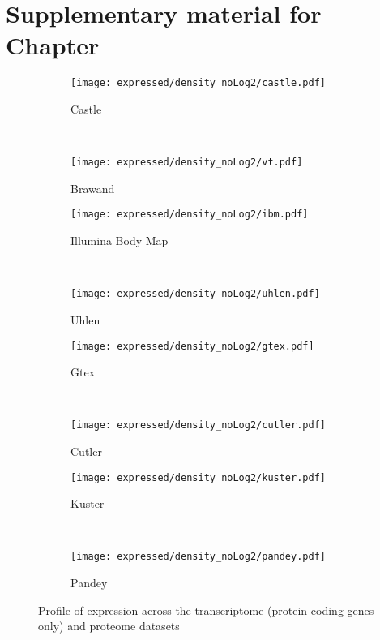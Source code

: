 \chapter{Supplementary material for Chapter }
\label{ch:SupplExpress}

\begin{figure}
    \centering
    \begin{subfigure}[b]{0.35\textwidth}
        \centering \texttt{[image: expressed/density\_noLog2/castle.pdf]}
        \caption{Castle}\label{fig:densityCastle_nolog2}
    \end{subfigure}%
~%
    \begin{subfigure}[b]{0.35\textwidth}
        \centering \texttt{[image: expressed/density\_noLog2/vt.pdf]}
        \caption{Brawand}\label{fig:densityBrawand_nolog2}
    \end{subfigure}

    \begin{subfigure}[b]{0.35\textwidth}
        \centering \texttt{[image: expressed/density\_noLog2/ibm.pdf]}
        \caption{Illumina Body Map}\label{fig:densityIBM_nolog2}
    \end{subfigure}%
~%
    \begin{subfigure}[b]{0.35\textwidth}
        \centering \texttt{[image: expressed/density\_noLog2/uhlen.pdf]}
        \caption{Uhlen}\label{fig:densityUhlen_nolog2}
    \end{subfigure}

    \begin{subfigure}[b]{0.35\textwidth}
        \centering \texttt{[image: expressed/density\_noLog2/gtex.pdf]}
        \caption{Gtex}\label{fig:densityGtex_nolog2}
    \end{subfigure}%
~%
    \begin{subfigure}[b]{0.35\textwidth}
        \centering \texttt{[image: expressed/density\_noLog2/cutler.pdf]}
        \caption{Cutler}\label{fig:densityCutler_nolog2}
    \end{subfigure}

    \begin{subfigure}[b]{0.35\textwidth}
        \centering \texttt{[image: expressed/density\_noLog2/kuster.pdf]}
        \caption{Kuster}\label{fig:densityKuster_nolog2}
    \end{subfigure}%
~%
    \begin{subfigure}[b]{0.35\textwidth}
        \centering \texttt{[image: expressed/density\_noLog2/pandey.pdf]}
        \caption{Pandey}\label{fig:densityPandey_nolog2}
    \end{subfigure}
    \caption{Profile of expression across the transcriptome (protein coding
    genes only) and proteome datasets}\label{fig:distribPlot_noLog2}
\end{figure}


